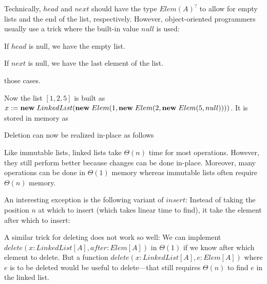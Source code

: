 Technically, $head$ and $next$ should have the type $Elem(A)^?$ to allow for empty lists and the end of the list, respectively.
However, object-oriented programmers usually use a trick where the built-in value $null$ is used:
\begin{compactitem}
 \item If $head$ is null, we have the empty list.
 \item If $next$ is null, we have the last element of the list.
\end{compactitem} those cases.

Now the list $[1,2,5]$ is built as $x:={\rm \bf new}\; LinkedList({\rm \bf new}\; Elem(1, {\rm \bf new}\; Elem(2, {\rm \bf new}\; Elem(5, null))))$.
It is stored in memory as
\begin{amemory}
\alocations
{}
\hline
{}
\hline
{}
\hline
{}
\end{amemory}

Deletion can now be realized in-place as follows
\begin{acode}
\end{acode}

Like immutable lists, linked lists take $\Theta(n)$ time for most operations.
However, they still perform better because changes can be done in-place.
Moreover, many operations can be done in $\Theta(1)$ memory whereas immutable lists often require $\Theta(n)$ memory.

An interesting exception is the following variant of $insert$:
Instead of taking the position $n$ at which to insert (which takes linear time to find), it take the element after which to insert:
\begin{acode}
\end{acode}

A similar trick for deleting does not work so well: We can implement $delete(x:LinkedList[A], after:Elem[A])$ in $\Theta(1)$ if we know after which element to delete.
But a function $delete(x:LinkedList[A], e:Elem[A])$ where $e$ is to be deleted would be useful to delete---that still requires $\Theta(n)$ to find $e$ in the linked list.

